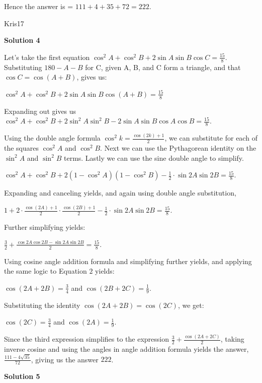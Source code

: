 \begin{enumerate}
 Hence the answer is = $111+4+35+72 = \boxed{222}$.

 Kris17

 



\textbf{Solution 4}

Let's take the first equation $\cos^2 A + \cos^2 B + 2 \sin A \sin B \cos C = \frac{15}{8}$. Substituting $180 - A - B$ for C, given A, B, and C form a triangle, and that $\cos C = \cos(A + B)$, gives us:

 $\cos^2 A + \cos^2 B + 2 \sin A \sin B \cos (A+B) = \frac{15}{8}$

 Expanding out gives us $\cos^2 A + \cos^2 B + 2 \sin^2 A \sin^2 B - 2 \sin A \sin B \cos A \cos B = \frac{15}{8}$. 

 Using the double angle formula $\cos^2 k = \frac{\cos (2k) + 1}{2}$, we can substitute for each of the squares $\cos^2 A$ and $\cos^2 B$. Next we can use the Pythagorean identity on the $\sin^2 A$ and $\sin^2 B$ terms. Lastly we can use the sine double angle to simplify.

 $\cos^2 A + \cos^2 B + 2(1 - \cos^2 A)(1 - \cos^2 B) - \frac{1}{2} \cdot \sin 2A \sin 2B = \frac{15}{8}$. 

 Expanding and canceling yields, and again using double angle substitution, 

 $1 + 2 \cdot \frac{\cos (2A) + 1}{2} \cdot \frac{\cos (2B) + 1}{2} - \frac{1}{2} \cdot \sin 2A \sin 2B = \frac{15}{8}$. 

 Further simplifying yields:

 $\frac{3}{2} + \frac{\cos 2A \cos 2B - \sin 2A \sin 2B}{2} = \frac{15}{8}$. 

 Using cosine angle addition formula and simplifying further yields, and applying the same logic to Equation $2$ yields:

 $\cos (2A + 2B) = \frac{3}{4}$ and $\cos (2B + 2C) = \frac{1}{9}$.

 Substituting the identity $\cos (2A + 2B) = \cos(2C)$, we get:

 $\cos (2C) = \frac{3}{4}$ and $\cos (2A) = \frac{1}{9}$.

 Since the third expression simplifies to the expression $\frac{3}{2} + \frac{\cos (2A + 2C)}{2}$, taking inverse cosine and using the angles in angle addition formula yields the answer, $\frac{111 - 4\sqrt{35}}{72}$, giving us the answer $\boxed{222}$.

 



\textbf{Solution 5}


\end{enumerate}
